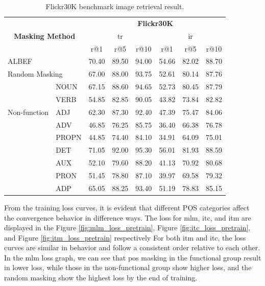 \begin{table}[h]
    \centering
    \caption{Flickr30K benchmark image retrieval result.}
    \label{tab:flickr30k}
    \begin{adjustbox}{width=0.8\textwidth}
        \begin{tabular}{ll|ccc|ccc}
            \hline
            \multicolumn{2}{c|}{\multirow{3}{*}{\textbf{Masking Method}}} & \multicolumn{6}{c}{\textbf{Flickr30K}} \\
            \multicolumn{2}{l|}{} & \multicolumn{3}{c|}{\acrshort{tr}} & \multicolumn{3}{c}{\acrshort{ir}} \\
            \multicolumn{2}{l|}{} & r@1 & r@5 & r@10 & r@1 & r@5 & r@10 \\
            \hline
            \multicolumn{2}{l|}{ALBEF} & 70.40 & 89.50 & 94.00 & 54.66 & 82.02 & 88.70 \\
            \hline
            \multicolumn{2}{l|}{Random Masking} & 67.00 & 88.00 & 93.75 & 52.61 & 80.14 & 87.76 \\
            \hline
            \multirow{5}{*}{Non-function} & NOUN & 67.15 & 88.60 & 94.65 & 52.73 & 80.45 & 87.79 \\
            & VERB & 54.85 & 82.85 & 90.05 & 43.82 & 73.84 & 82.82 \\
            & ADJ & 62.30 & 87.30 & 92.40 & 47.39 & 75.47 & 84.06 \\
            & ADV & 46.85 & 76.25 & 85.75 & 36.40 & 66.38 & 76.78 \\
            & PROPN & 44.85 & 74.40 & 84.10 & 34.91 & 64.09 & 75.01 \\
            \hline
            \rowcolor{green} \multirow{4}{*}{Function} & DET & 71.05 & 92.00 & 95.30 & 56.01 & 81.93 & 88.59 \\
            & AUX  & 52.10 & 79.60 & 88.20 & 41.13 & 70.92 & 80.68 \\
            & PRON & 51.45 & 78.80 & 87.10 & 39.97 & 69.58 & 79.32 \\
            & ADP & 65.05 & 88.25 & 93.40 & 51.19 & 78.83 & 85.15 \\
            \hline
        \end{tabular}
    \end{adjustbox}
\end{table}

From the training loss curves, it is evident that different POS categories affect the convergence behavior in difference ways.
The loss for \acrshort{mlm}, \acrshort{itc}, and \acrshort{itm} are displayed in the Figure \ref{fig:mlm_loss_pretrain}, Figure \ref{fig:itc_loss_pretrain}, and Figure \ref{fig:itm_loss_pretrain} respectively
For both \acrshort{itm} and \acrshort{itc}, the loss curves are similar in behavior and follow a consistent order relative to each other.
In the \acrshort{mlm} loss graph, we can see that \acrshort{pos} masking in the functional group result in lower loss, while those in the non-functional group show higher loss, and the random masking show the highest loss by the end of training.

